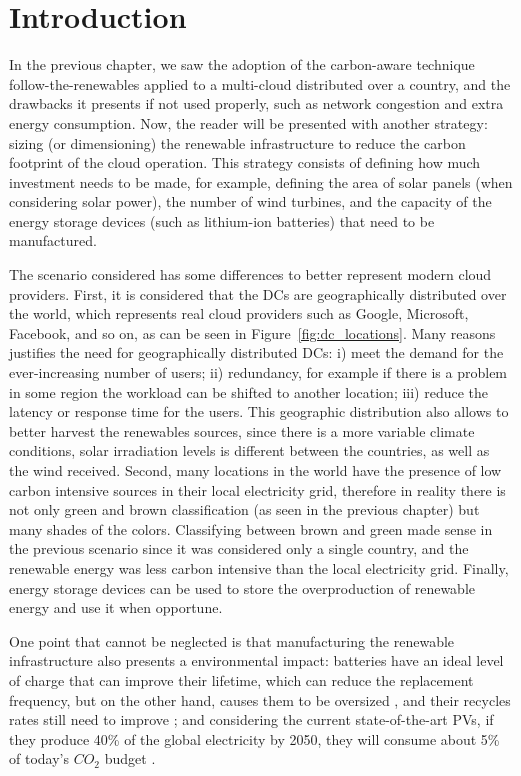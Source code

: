 \section{Introduction}

In the previous chapter, we saw the adoption of the carbon-aware technique follow-the-renewables applied to a multi-cloud distributed over a country, and the drawbacks it presents if not used properly, such as network congestion and extra energy consumption. Now, the reader will be presented with another strategy: sizing (or dimensioning) the renewable infrastructure to reduce the carbon footprint of the cloud operation. This strategy consists of defining how much investment needs to be made, for example, defining the area of solar panels (when considering solar power), the number of wind turbines, and the capacity of the energy storage devices (such as lithium-ion batteries) that need to be manufactured. 

The scenario considered has some differences to better represent modern cloud providers. First, it is considered that the DCs are geographically distributed over the world, which represents real cloud providers such as Google, Microsoft, Facebook, and so on, as can be seen in Figure~\ref{fig:dc_locations}. Many reasons justifies the need for geographically distributed DCs: i) meet the demand for the ever-increasing number of users; ii) redundancy, for example if there is a problem in some region the workload can be shifted to another location; iii) reduce the latency or response time for the users. This geographic distribution also allows to better harvest the renewables sources, since there is a more variable climate conditions, solar irradiation levels is different between the countries, as well as the wind received. Second, many locations in the world have the presence of low carbon intensive sources in their local electricity grid, therefore in reality there is not only green and brown classification (as seen in the previous chapter) but many shades of the colors. Classifying between brown and green made sense in the previous scenario since it was considered only a single country, and the renewable energy was less carbon intensive than the local electricity grid. Finally, energy storage devices can be used to store the overproduction of renewable energy and use it when opportune.

One point that cannot be neglected is that manufacturing the renewable infrastructure also presents a environmental impact: batteries have an ideal level of charge that can improve their lifetime, which can reduce the replacement frequency, but on the other hand, causes them to be oversized \cite{batteries_baumman}, and their recycles rates still need to improve \cite{bateries_RAHMAN}; and considering the current state-of-the-art PVs, if they produce 40\% of the global electricity by 2050, they will consume about 5\% of today’s ${CO_2}$ budget \cite{solar_co2}.


